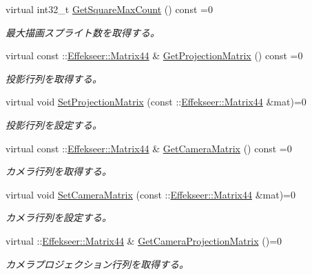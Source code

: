 \begin{DoxyCompactItemize}
virtual int32\+\_\+t \mbox{\hyperlink{class_effekseer_renderer_1_1_renderer_af30b6ab25e7c03a3f70656c954e8db09}{Get\+Square\+Max\+Count}} () const =0
\begin{DoxyCompactList}\small\item\em 最大描画スプライト数を取得する。 \end{DoxyCompactList}\item 
virtual const \+::\mbox{\hyperlink{struct_effekseer_1_1_matrix44}{Effekseer\+::\+Matrix44}} \& \mbox{\hyperlink{class_effekseer_renderer_1_1_renderer_a7a94e69a46222064baf9394405a7c9a9}{Get\+Projection\+Matrix}} () const =0
\begin{DoxyCompactList}\small\item\em 投影行列を取得する。 \end{DoxyCompactList}\item 
virtual void \mbox{\hyperlink{class_effekseer_renderer_1_1_renderer_a270c020aeb8cef8b0f1a9a02980d685d}{Set\+Projection\+Matrix}} (const \+::\mbox{\hyperlink{struct_effekseer_1_1_matrix44}{Effekseer\+::\+Matrix44}} \&mat)=0
\begin{DoxyCompactList}\small\item\em 投影行列を設定する。 \end{DoxyCompactList}\item 
virtual const \+::\mbox{\hyperlink{struct_effekseer_1_1_matrix44}{Effekseer\+::\+Matrix44}} \& \mbox{\hyperlink{class_effekseer_renderer_1_1_renderer_a9c386cbe84039115d2f7d224d8a9c41c}{Get\+Camera\+Matrix}} () const =0
\begin{DoxyCompactList}\small\item\em カメラ行列を取得する。 \end{DoxyCompactList}\item 
virtual void \mbox{\hyperlink{class_effekseer_renderer_1_1_renderer_a406e4bf44f11d3437af46cca718529b0}{Set\+Camera\+Matrix}} (const \+::\mbox{\hyperlink{struct_effekseer_1_1_matrix44}{Effekseer\+::\+Matrix44}} \&mat)=0
\begin{DoxyCompactList}\small\item\em カメラ行列を設定する。 \end{DoxyCompactList}\item 
virtual \+::\mbox{\hyperlink{struct_effekseer_1_1_matrix44}{Effekseer\+::\+Matrix44}} \& \mbox{\hyperlink{class_effekseer_renderer_1_1_renderer_a62e05934631fa04e75ffb87952200042}{Get\+Camera\+Projection\+Matrix}} ()=0
\begin{DoxyCompactList}\small\item\em カメラプロジェクション行列を取得する。 \end{DoxyCompactList}\item 

\end{DoxyCompactItemize}
